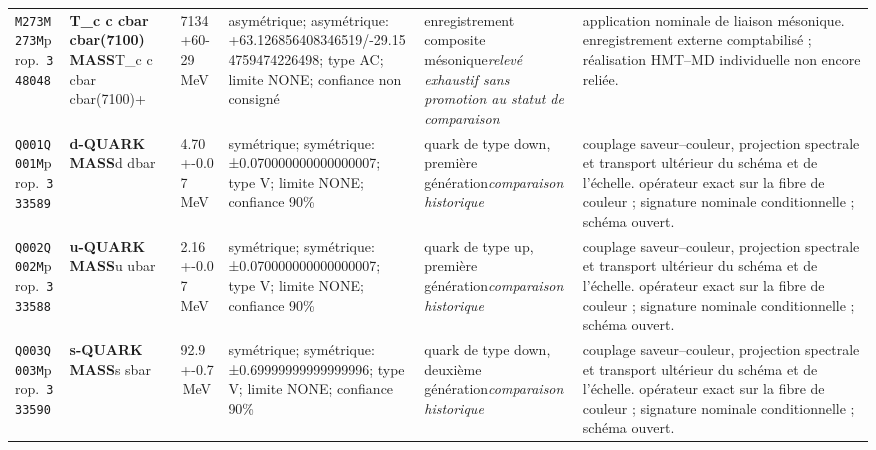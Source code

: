 \begin{landscape}
\begin{longtable}{L{1.85cm}L{4.45cm}L{2.35cm}L{4.05cm}L{3.35cm}L{7.15cm}}
\texttt{M273}\newline \texttt{M273M}\newline prop.\ \texttt{348048} & \textbf{T\_\allowbreak{}c c cbar cbar(7100) MASS}\newline T\_\allowbreak{}c c cbar cbar(7100)+ & 7134+60-29\,MeV & asymétrique; asymétrique: +63.126856408346519/-29.154759474226498; type AC; limite NONE; confiance non consigné & enregistrement composite mésonique\newline \emph{relevé exhaustif sans promotion au statut de comparaison} & application nominale de liaison mésonique. enregistrement externe comptabilisé ; réalisation HMT--MD individuelle non encore reliée. \\
\texttt{Q001}\newline \texttt{Q001M}\newline prop.\ \texttt{333589} & \textbf{d-QUARK MASS}\newline d \textbar{}\allowbreak{} dbar & 4.70+-0.07\,MeV & symétrique; symétrique: ±0.070000000000000007; type V; limite NONE; confiance 90\% & quark de type down, première génération\newline \emph{comparaison historique} & couplage saveur--couleur, projection spectrale et transport ultérieur du schéma et de l'échelle. opérateur exact sur la fibre de couleur ; signature nominale conditionnelle ; schéma ouvert. \\
\texttt{Q002}\newline \texttt{Q002M}\newline prop.\ \texttt{333588} & \textbf{u-QUARK MASS}\newline u \textbar{}\allowbreak{} ubar & 2.16+-0.07\,MeV & symétrique; symétrique: ±0.070000000000000007; type V; limite NONE; confiance 90\% & quark de type up, première génération\newline \emph{comparaison historique} & couplage saveur--couleur, projection spectrale et transport ultérieur du schéma et de l'échelle. opérateur exact sur la fibre de couleur ; signature nominale conditionnelle ; schéma ouvert. \\
\texttt{Q003}\newline \texttt{Q003M}\newline prop.\ \texttt{333590} & \textbf{s-QUARK MASS}\newline s \textbar{}\allowbreak{} sbar & 92.9+-0.7\,MeV & symétrique; symétrique: ±0.69999999999999996; type V; limite NONE; confiance 90\% & quark de type down, deuxième génération\newline \emph{comparaison historique} & couplage saveur--couleur, projection spectrale et transport ultérieur du schéma et de l'échelle. opérateur exact sur la fibre de couleur ; signature nominale conditionnelle ; schéma ouvert. \\

\end{longtable}
\end{landscape}
